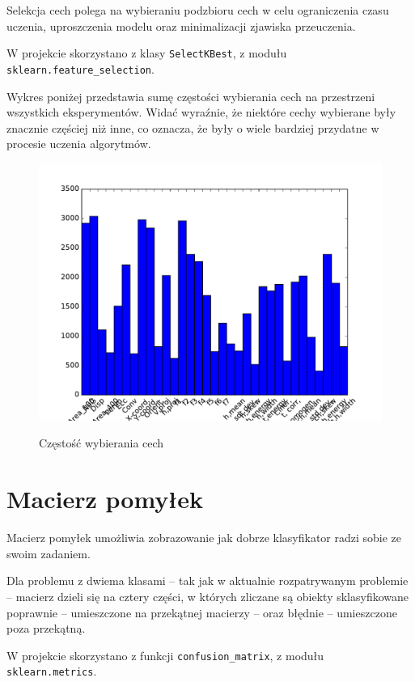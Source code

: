 Selekcja cech polega na wybieraniu podzbioru cech w celu ograniczenia czasu uczenia, uproszczenia modelu oraz minimalizacji zjawiska przeuczenia.

W projekcie skorzystano z klasy \texttt{SelectKBest}, z modułu \texttt{sklearn.feature\_selection}.

Wykres poniżej przedstawia sumę częstości wybierania cech na przestrzeni wszystkich eksperymentów. Widać wyraźnie, że niektóre cechy wybierane były znacznie częściej niż inne, co oznacza, że były o wiele bardziej przydatne w procesie uczenia algorytmów.

\begin{figure}[h!]
	\centering
	\includegraphics[width=1.0\linewidth]{img/features.pdf}
	\label{selekcja}
	\caption{Częstość wybierania cech}
\end{figure}

\newpage

\section{Macierz pomyłek}

Macierz pomyłek umożliwia zobrazowanie jak dobrze klasyfikator radzi sobie ze swoim zadaniem.

Dla problemu z dwiema klasami -- tak jak w aktualnie rozpatrywanym problemie -- macierz dzieli się na cztery części, w których zliczane są obiekty sklasyfikowane poprawnie -- umieszczone na przekątnej macierzy -- oraz błędnie -- umieszczone poza przekątną.

W projekcie skorzystano z funkcji \texttt{confusion\_matrix}, z modułu \texttt{sklearn.metrics}.

